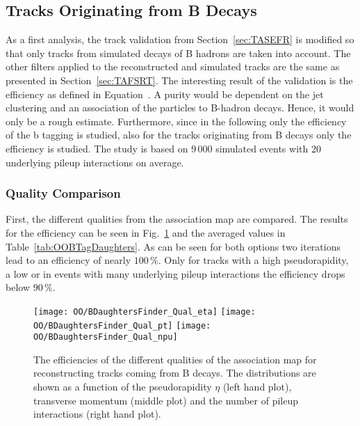 \subsection{Tracks Originating from B Decays \label{sec:OOBTagDaughters}}

As a first analysis, the track validation from Section~\ref{sec:TASEFR} is modified so that only tracks from simulated decays of B hadrons are taken into account. The other filters applied to the reconstructed and simulated tracks are the same as presented in Section~\ref{sec:TAFSRT}. The interesting result of the validation is the efficiency as defined in Equation~. A purity would be dependent on the jet clustering and an association of the particles to B-hadron decays. Hence, it would only be a rough estimate. Furthermore, since in the following only the efficiency of the b tagging is studied, also for the tracks originating from B decays only the efficiency is studied. The study is based on 9\,000 simulated \ttbar events with 20 underlying pileup interactions on average.

\subsubsection{Quality Comparison \label{sec:OOBTagDaughtersQual}}

First, the different qualities from the association map are compared. The results for the efficiency can be seen in Fig.~\ref{plot:OOBTagDaughtersQual} and the averaged values in Table~\ref{tab:OOBTagDaughters}. As can be seen for both options two iterations lead to an efficiency of nearly $100\,\%$. Only for tracks with a high pseudorapidity, a low \pt or in events with many underlying pileup interactions the efficiency drops below $90\,\%$. 

\begin{figure}[h!t]
  \centering
  \texttt{[image: OO/BDaughtersFinder\_Qual\_eta]}
  \texttt{[image: OO/BDaughtersFinder\_Qual\_pt]}
  \texttt{[image: OO/BDaughtersFinder\_Qual\_npu]}
  \caption[Efficiencies of the different qualities of the association map for reconstructing tracks from B decays]{The efficiencies of the different qualities of the association map for reconstructing tracks coming from B decays. The distributions are shown as a function of the pseudorapidity $\eta$ (left hand plot), transverse momentum (middle plot) and the number of pileup interactions (right hand plot). \label{plot:OOBTagDaughtersQual}}
\end{figure}


